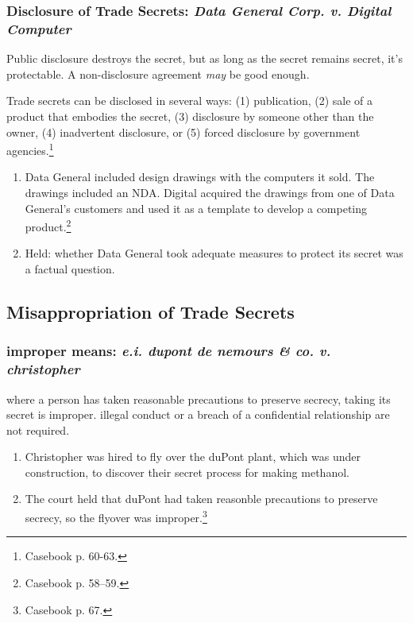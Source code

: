 \subsubsection{Disclosure of Trade Secrets: \emph{Data General Corp. v. 
Digital Computer}}

Public disclosure destroys the secret, but as long as the secret remains 
secret, it's protectable. A non-disclosure agreement \emph{may} be good 
enough.

Trade secrets can be disclosed in several ways: (1) publication, (2) sale of a 
product that embodies the secret, (3) disclosure by someone other than the 
owner, (4) inadvertent disclosure, or (5) forced disclosure by government 
agencies.\footnote{Casebook p. 60-63.}

\begin{enumerate}
    \item Data General included design drawings with the computers it sold. 
    The drawings included an NDA. Digital acquired the drawings from one of 
    Data General's customers and used it as a template to develop a competing 
    product.\footnote{Casebook p. 58--59.}
    \item Held: whether Data General took adequate measures to protect its 
    secret was a factual question.
\end{enumerate}

\subsection{Misappropriation of Trade Secrets}

\subsubsection{improper means: \emph{e.i. dupont de nemours \& co. v. 
christopher}}

where a person has taken reasonable precautions to preserve secrecy, taking 
its secret is improper. illegal conduct or a breach of a confidential 
relationship are not required.

\begin{enumerate}
    \item Christopher was hired to fly over the duPont plant, which was under 
    construction, to discover their secret process for making methanol.
    \item The court held that duPont had taken reasonble precautions to 
    preserve secrecy, so the flyover was improper.\footnote{Casebook p. 67.}
\end{enumerate}


